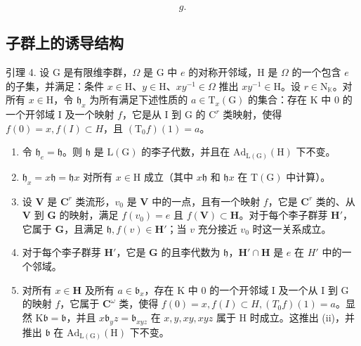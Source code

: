 \[
g.
\]

\subsection{子群上的诱导结构}

引理 4. 设 G 是有限维李群，\(\Omega\) 是 G 中 \(e\) 的对称开邻域，H 是 \(\Omega\) 的一个包含 \(e\) 的子集，并满足：条件 \(x \in \mathrm{H}\)、\(y \in \mathrm{H}\)、\(xy^{-1} \in \Omega\) 推出 \(xy^{-1} \in \mathrm{H}\)。设 \(r \in \mathrm{N}_{\mathbb{K}}\)。对所有 \(x \in \mathrm{H}\)，令 \(\mathfrak{h}_x\) 为所有满足下述性质的 \(a \in \mathrm{T}_x(\mathrm{G})\) 的集合：存在 K 中 0 的一个开邻域 I 及一个映射 \(f\)，它是从 I 到 G 的 \(\mathrm{C}^r\) 类映射，使得 \(f(0) = x, f(I) \subset H\)，且 \((\mathrm{T}_0f)(1) = a\)。

\begin{enumerate}
\def\labelenumi{(\roman{enumi})}
\item
  令 \(\mathfrak{h}_e = \mathfrak{h}\)。则 \(\mathfrak{h}\) 是 \(\mathrm{L}(\mathrm{G})\) 的李子代数，并且在 \(\mathrm{Ad}_{\mathrm{L}(\mathrm{G})}(\mathrm{H})\) 下不变。
\item
  \(\mathfrak{h}_x = x\mathfrak{h} = \mathfrak{h}x\) 对所有 \(x\in \mathrm{H}\) 成立（其中 \(x\mathfrak{h}\) 和 \(\mathfrak{h}x\) 在 \(\mathrm{T(G)}\) 中计算）。
\item
  设 \(\mathbf{V}\) 是 \(\mathbf{C}^r\) 类流形，\(v_0\) 是 \(\mathbf{V}\) 中的一点，且有一个映射 \(f\)，它是 \(\mathbf{C}^r\) 类的、从 \(\mathbf{V}\) 到 \(\mathbf{G}\) 的映射，满足 \(f(v_0) = e\) 且 \(f(\mathbf{V}) \subset \mathbf{H}\)。对于每个李子群芽 \(\mathbf{H}'\)，它属于 \(\mathbf{G}\)，且满足 \(\mathfrak{h}, f(v) \in \mathbf{H}'\)；当 \(v\) 充分接近 \(v_0\) 时这一关系成立。
\item
  对于每个李子群芽 \(\mathbf{H}'\)，它是 \(\mathbf{G}\) 的且李代数为 \(\mathfrak{h}\)，\(\mathbf{H}' \cap \mathbf{H}\) 是 \(e\) 在 \(H'\) 中的一个邻域。
\item
  对所有 \(x \in \mathbf{H}\) 及所有 \(a \in \mathfrak{b}_x\)，存在 K 中 0 的一个开邻域 I 及一个从 I 到 G 的映射 \(f\)，它属于 \(\mathbf{C}^{\omega}\) 类，使得 \(f(0) = x, f(I) \subset H, (T_0f)(1) = a\)。显然 \(\mathrm{K}\mathfrak{b} = \mathfrak{b}\)，并且 \(x\mathfrak{b}_y z = \mathfrak{b}_{xyz}\) 在 \(x, y, xy, xyz\) 属于 H 时成立。这推出 (ii)，并推出 \(\mathfrak{b}\) 在 \(\mathrm{Ad}_{\mathrm{L(G)}}(\mathrm{H})\) 下不变。
\end{enumerate}

